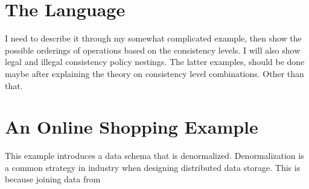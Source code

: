 

\section{The  Language}
I need to describe it through my somewhat complicated example, then show the
possible orderings of operations based on the consistency levels. I will also
show legal and illegal consistency policy nestings. The latter examples, should
be done maybe after explaining the theory on consistency level combinations.
Other than that. 

\section{An Online Shopping Example}
This example introduces a data schema that is denormalized. Denormalization is a
common strategy in industry when designing distributed data storage. This is
because joining data from 


